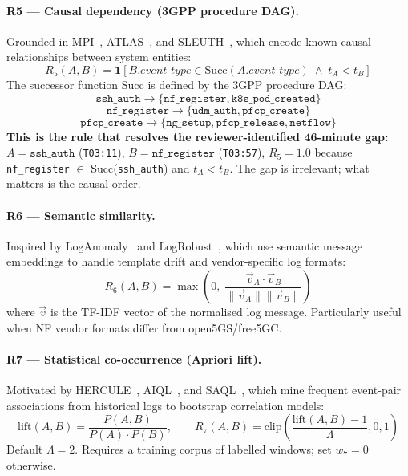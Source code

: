 \paragraph{R5 — Causal dependency (3GPP procedure DAG).}
Grounded in MPI~\cite{ma2017mpi}, ATLAS~\cite{alsaheel2021atlas}, and
SLEUTH~\cite{hossain2017sleuth}, which encode known causal relationships
between system entities:
\begin{equation}
R_5(A,B) = \mathbf{1}[B.\textit{event\_type} \in \text{Succ}(A.\textit{event\_type})
\;\wedge\; t_A < t_B]
\end{equation}
The successor function Succ is defined by the 3GPP procedure DAG:
\[
\texttt{ssh\_auth} \to \{\texttt{nf\_register}, \texttt{k8s\_pod\_created}\}
\]
\[
\texttt{nf\_register} \to \{\texttt{udm\_auth}, \texttt{pfcp\_create}\}
\]
\[
\texttt{pfcp\_create} \to \{\texttt{ng\_setup}, \texttt{pfcp\_release}, \texttt{netflow}\}
\]
\textbf{This is the rule that resolves the reviewer-identified 46-minute gap:}
$A = \texttt{ssh\_auth}$ (\texttt{T03:11}),
$B = \texttt{nf\_register}$ (\texttt{T03:57}),
$R_5 = 1.0$ because \texttt{nf\_register} $\in$ Succ(\texttt{ssh\_auth}) and $t_A < t_B$.
The gap is irrelevant; what matters is the causal order.

\paragraph{R6 — Semantic similarity.}
Inspired by LogAnomaly~\cite{meng2019loganomaly} and
LogRobust~\cite{zhang2019logrobust}, which use semantic message embeddings
to handle template drift and vendor-specific log formats:
\begin{equation}
R_6(A,B) = \max\!\left(0,\;\frac{\vec{v}_A \cdot \vec{v}_B}{\|\vec{v}_A\|\|\vec{v}_B\|}\right)
\end{equation}
where $\vec{v}$ is the TF-IDF vector of the normalised log message.
Particularly useful when NF vendor formats differ from open5GS/free5GC.

\paragraph{R7 — Statistical co-occurrence (Apriori lift).}
Motivated by HERCULE~\cite{pei2016hercule}, AIQL~\cite{gao2018aiql},
and SAQL~\cite{gao2018saql}, which mine frequent event-pair associations
from historical logs to bootstrap correlation models:
\begin{equation}
\text{lift}(A,B) = \frac{P(A,B)}{P(A)\cdot P(B)}, \qquad
R_7(A,B) = \text{clip}\!\left(\frac{\text{lift}(A,B)-1}{\Lambda}, 0, 1\right)
\end{equation}
Default $\Lambda = 2$. Requires a training corpus of labelled windows;
set $w_7 = 0$ otherwise.

